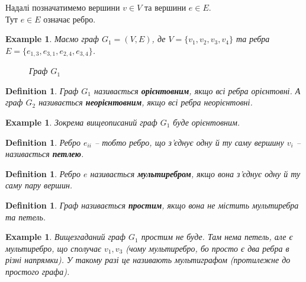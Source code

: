 \documentclass[a4paper, 14pt]{extarticle}
\theoremstyle{theoremdd}
\theoremstyle{theoremdd}
\newtheorem{definition}[theorem]{Definition}
\theoremstyle{theoremdd}
\theoremstyle{theoremdd}
\theoremstyle{theoremdd}
\newtheorem{example}[theorem]{Example}
\theoremstyle{theoremdd}
\theoremstyle{theoremdd}
\theoremstyle{theoremdd}
\theoremstyle{theoremdd}
\theoremstyle{theoremdd}
\theoremstyle{theoremdd}
\theoremstyle{theoremdd}
\theoremstyle{theoremdd}
\theoremstyle{theoremdd}
\theoremstyle{theoremdd}
\begin{document}
Надалі позначатимемо вершини $v \in V$ та вершини $e \in E$.\\
Тут $e \in E$ означає ребро.

\begin{example}
Маємо граф $G_1 = (V,E)$, де $V = \{v_1,v_2,v_3,v_4\}$ та ребра $E = \{e_{1,3}, e_{3,1}, e_{2,4},e_{3,4}\}$.
\begin{figure}[H]
\centering
{}
\caption*{Граф $G_1$}
\end{figure}
\end{example}

\begin{definition}
Граф $G_1$ називається \textbf{орієнтовним}, якщо всі ребра орієнтовні. А граф $G_2$ називається \textbf{неорієнтовним}, якщо всі ребра неорієнтовні.
\end{definition}

\begin{example}
Зокрема вищеописаний граф $G_1$ буде орієнтовним.
\end{example}

\begin{definition}
Ребро $e_{ii}$ -- тобто ребро, що з'єднує одну й ту саму вершину $v_i$ -- називається \textbf{петлею}.
\end{definition}

\begin{definition}
Ребро $e$ називається \textbf{мультиребром}, якщо вона з'єднує одну й ту саму пару вершин.
\end{definition}

\begin{definition}
Граф називається \textbf{простим}, якщо вона не містить мультиребра та петель.
\end{definition}

\begin{example}
Вищезгаданий граф $G_1$ простим не буде. Там нема петель, але є мультиребро, що сполучає $v_1,v_3$ (чому мультиребро, бо просто є два ребра в різні напрямки). У такому разі це називають мультиграфом (протилежне до простого графа).
\end{example}
\end{document}
